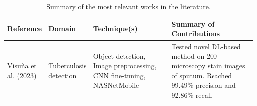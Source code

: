 \documentclass[../main.tex]{subfiles}
\begin{document}
    \begin{table}[p]
        \caption{Summary of the most relevant works in the literature.}
        \label{tab:sota_summary}
        \hspace*{-1.5cm}
        \begin{tabular}{
            p{0.14\linewidth} | p{0.13\linewidth} | p{0.35\linewidth} | p{0.5\linewidth} 
        }
        \toprule
        \textbf{Reference} & \textbf{Domain} &\textbf{Technique(s)} & \textbf{Summary of Contributions} \\
        \midrule
        Visuña et al. (2023) \cite{visuna_novel_2023} & Tuberculosis detection & Object detection, Image preprocessing, CNN fine-tuning, NASNetMobile & Tested novel DL-based method on 200 microscopy stain images of sputum. Reached  99.49\% precision and 92.86\% recall \\
        \bottomrule
        \end{tabular}
    \end{table}

    
    
    
\end{document}
